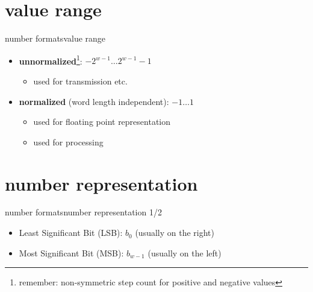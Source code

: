 \section[range]{value range}
	\begin{frame}{number formats}{value range}
		
            
			\begin{itemize}
				\item	\textbf{unnormalized}\footnote{remember: non-symmetric step count for positive and negative values}: $-2^{w-1}\ldots 2^{w-1}-1$
                    \begin{itemize}
                        \item   used for transmission etc.
                    \end{itemize}
				\bigskip
                \item	\textbf{normalized} (word length independent): $-1\ldots 1$
                    \begin{itemize}
                        \item   used for floating point representation
                        \item   used for processing
                    \end{itemize}
			\end{itemize}
            
            
	\end{frame}	

\section[number representation]{number representation}
	\begin{frame}{number formats}{number representation 1/2}
		\begin{itemize}
			\item	Least Significant Bit (LSB): $b_0$ (usually on the right)
			\item	Most Significant Bit (MSB): $b_{w-1}$ (usually on the left)
		\end{itemize}
	\end{frame}	

